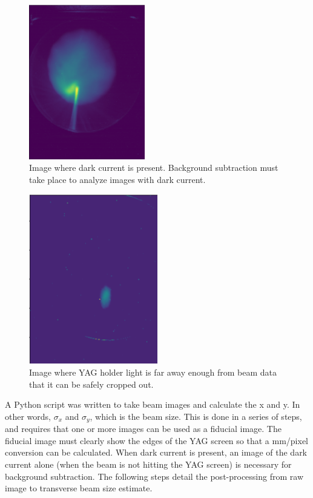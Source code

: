 \begin{figure}
	\centering
	\includegraphics[width=0.45\textwidth]{images/darkcurrent}
	\caption{Image where dark current is present. Background subtraction must take place to 
	analyze images with dark current.}
	\label{fig:darkcurrent}
\end{figure}	
\begin{figure}
	\centering
	\includegraphics[width=0.5\textwidth]{images/cleanyag}
	\caption{Image where YAG holder light is far away enough from beam data that it can be safely cropped out.}
	\label{fig:clean}
\end{figure}

A Python script was written to take beam images and calculate the x and y.
In other words, $\sigma_{x}$ and $\sigma_y$, which is the beam size. 
This is done in a series of steps, and requires that one or more images can be used as a 
fiducial image. The fiducial image must clearly show the edges of the YAG screen so that a 
mm/pixel conversion can be calculated.
When dark current is present, an image of the dark current alone
(when the beam is not hitting the YAG screen) is necessary for background subtraction.
The following steps detail the post-processing from raw image to transverse beam size estimate.

